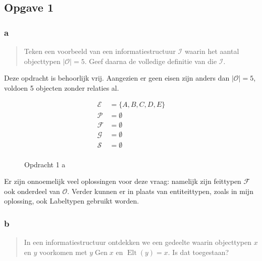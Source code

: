 \documentclass[11pt]{article}
\newcommand{\Gen}{\ensuremath{\operatorname{Gen}}}
\begin{document}
\subsection{Opgave 1}

\subsubsection{a}
\begin{quote}
  Teken een voorbeeld van een informatiestructuur $\mathcal{I}$ waarin het aantal objecttypen 
  $|\mathcal{O}| = 5$. Geef daarna de volledige definitie van die $\mathcal{I}$.\cite{tentamen2011}
\end{quote}

Deze opdracht is behoorlijk vrij. Aangezien er geen eisen zijn anders dan
$|\mathcal{O}| =5$, voldoen 5 objecten zonder relaties al. 

\begin{align*}
  \mathcal{E} & = \{A,B,C,D,E\} \\
  \mathcal{P} & = \emptyset\\
  \mathcal{F} & = \emptyset \\
  \mathcal{G} & = \emptyset        \\  
  \mathcal{S} & = \emptyset        \\
\end{align*}


\begin{figure}[h]
  \centering
  \caption{Opdracht 1 a}
  \label{fig:5-1-a}
\end{figure}

Er zijn onnoemelijk veel oplossingen voor deze vraag: namelijk zijn feittypen
$\mathcal{F}$ ook onderdeel van $\mathcal{O}$. Verder kunnen er in plaats van
entiteittypen, zoals in mijn oplossing, ook Labeltypen gebruikt worden.

\subsubsection{b}

\begin{quote}
  In een informatiestructuur ontdekken we een gedeelte waarin objecttypen $x$ en
  $y$ voorkomen met $y \Gen x$ en $\operatorname{Elt}(y) = x$. Is dat toegestaan?
  \cite{tentamen2011}
\end{quote}
\end{document}
